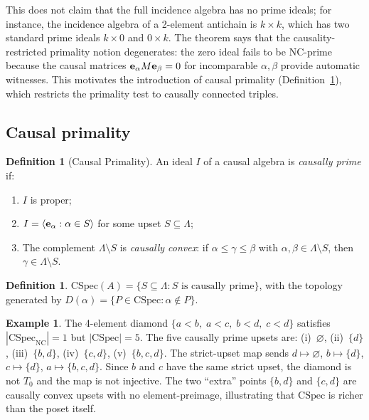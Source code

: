 \documentclass[11pt,a4paper]{article}
\theoremstyle{plain}
\theoremstyle{definition}
\newtheorem{definition}[theorem]{Definition}
\newtheorem{example}[theorem]{Example}
\theoremstyle{remark}
\newcommand{\CSpec}{\mathrm{CSpec}}
\begin{document}
\noindent
This does not claim that the full incidence algebra has no prime ideals; for instance, the incidence algebra of a 2-element antichain is $k \times k$, which has two standard prime ideals $k \times 0$ and $0 \times k$.
The theorem says that the causality-restricted primality notion degenerates: the zero ideal fails to be NC-prime because the causal matrices ${\bf e}_\alpha M {\bf e}_\beta = 0$ for incomparable $\alpha, \beta$ provide automatic witnesses.
This motivates the introduction of causal primality (Definition~\ref{def:cprime}), which restricts the primality test to causally connected triples.

\subsection{Causal primality}

\begin{definition}[Causal Primality]\label{def:cprime}
An ideal $I$ of a causal algebra is \emph{causally prime} if:
\begin{enumerate}[nosep]
\item $I$ is proper;
\item $I = \langle {\bf e}_\alpha : \alpha \in S\rangle$ for some upset $S \subseteq \Lambda$;
\item The complement $\Lambda \setminus S$ is \emph{causally convex}: if $\alpha \leq \gamma \leq \beta$ with $\alpha, \beta \in \Lambda \setminus S$, then $\gamma \in \Lambda \setminus S$.
\end{enumerate}
\end{definition}

\begin{definition}
$\CSpec(A) = \{S \subseteq \Lambda : S \text{ is causally prime}\}$, with the topology generated by
$D(\alpha) = \{P \in \CSpec : \alpha \notin P\}$.
\end{definition}

\begin{example}
The 4-element diamond $\{a < b,\; a < c,\; b < d,\; c < d\}$ satisfies $|\CSpec_{\mathrm{NC}}| = 1$ but $|\CSpec| = 5$. The five causally prime upsets are:
(i)~$\varnothing$,
(ii)~$\{d\}$,
(iii)~$\{b,d\}$,
(iv)~$\{c,d\}$,
(v)~$\{b,c,d\}$.
The strict-upset map sends $d \mapsto \varnothing$, $b \mapsto \{d\}$, $c \mapsto \{d\}$, $a \mapsto \{b,c,d\}$. Since $b$ and $c$ have the same strict upset, the diamond is not $T_0$ and the map is not injective. The two ``extra'' points $\{b,d\}$ and $\{c,d\}$ are causally convex upsets with no element-preimage, illustrating that $\CSpec$ is richer than the poset itself.
\end{example}
\end{document}
